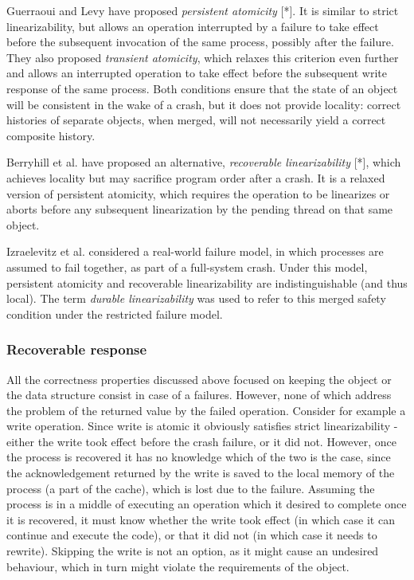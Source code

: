 \documentclass{article}
\begin{document}
Guerraoui and Levy have proposed \emph{persistent atomicity} [*]. It is similar to strict linearizability, but allows an operation interrupted by a failure to take effect before the subsequent invocation of the same process, possibly after the failure. They also proposed \emph{transient atomicity}, which relaxes this criterion even further and allows an interrupted operation to take effect before the subsequent write response of the same process. Both conditions ensure that the state of an object will be consistent in the wake of a crash, but it does not provide locality: correct histories of separate objects, when merged, will not necessarily yield a correct composite history.

Berryhill et al. have proposed an alternative, \emph{recoverable linearizability} [*], which achieves locality but may sacrifice program order after a crash. It is a relaxed version of persistent atomicity, which requires the operation to be linearizes or aborts before any subsequent linearization by the pending thread on that same object.

Izraelevitz et al. considered a real-world failure model, in which processes are assumed to fail together, as part of a full-system crash. Under this model, persistent atomicity and recoverable linearizability are indistinguishable (and thus local). The term \emph{durable linearizability} was used to refer to this merged safety condition under the restricted failure model.

\subsubsection{Recoverable response}
All the correctness properties discussed above focused on keeping the object or the data structure consist in case of a failures. However, none of which address the problem of the returned value by the failed operation. Consider for example a write operation. Since write is atomic it obviously satisfies strict linearizability - either the write took effect before the crash failure, or it did not. However, once the process is recovered it has no knowledge which of the two is the case, since the acknowledgement returned by the write is saved to the local memory of the process (a part of the cache), which is lost due to the failure. Assuming the process is in a middle of executing an operation which it desired to complete once it is recovered, it must know whether the write took effect (in which case it can continue and execute the code), or that it did not (in which case it needs to rewrite). Skipping the write is not an option, as it might cause an undesired behaviour, which in turn might violate the requirements of the object.
\end{document}
